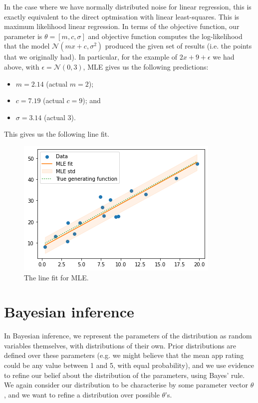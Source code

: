 \documentclass[a4paper, openany]{memoir}
\begin{document}
In the case where we have normally distributed noise for linear regression, this is exactly equivalent to the direct optmisation with linear least-squares. This is maximum likelihood linear regression. In terms of the objective function, our parameter is $\theta = [m, c, \sigma]$ and objective function computes the log-likelihood that the model $\mathcal{N}(mx + c, \sigma^2)$ produced the given set of results (i.e. the points that we originally had). In particular, for the example of $2x+9+\epsilon$ we had above, with $\epsilon = \mathcal{N}(0, 3)$, MLE gives us the following predictions:
\begin{itemize}
    \item $m = 2.14$ (actual $m = 2$);
    \item $c = 7.19$ (actual $c = 9$); and
    \item $\sigma = 3.14$ (actual $3$).
\end{itemize}
This gives us the following line fit.
\begin{figure}[H]
    \centering
    \includegraphics[scale=0.7]{src/5.28 linefit mle.png}
    \caption{The line fit for MLE.}
\end{figure}

\section{Bayesian inference}
In Bayesian inference, we represent the parameters of the distribution as random variables themselves, with distributions of their own. Prior distributions are defined over these parameters (e.g. we might believe that the mean app rating could be any value between 1 and 5, with equal probability), and we use evidence to refine our belief about the distribution of the parameters, using Bayes' rule. We again consider our distribution to be characterise by some parameter vector $\theta$, and we want to refine a distribution over possible $\theta$'s.
\end{document}
